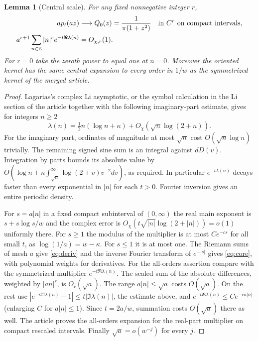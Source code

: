 \documentclass[11pt]{article}
\newtheorem{lemma}[theorem]{Lemma}
\theoremstyle{remark}\newtheorem{remark}[theorem]{Remark}
\begin{document}
\begin{lemma}[Central scale]\label{lem:core}
For any fixed nonnegative integer $r$,
\begin{align}
 a p_t(az)&\longrightarrow Q_0(z)=\frac{1}{\pi(1+z^2)}
       &&\text{in } C^r\text{ on compact intervals},\label{eq:core}\\
 a^{r+1}\sum_{n\in\mathbb Z}|n|^r e^{-t\Re\lambda(n)}&=O_{\chi,r}(1).
       \label{eq:deriv}
\end{align}
For $r=0$ take the zeroth power to equal one at $n=0$.
Moreover the oriented kernel has the same central expansion to every order
in $1/w$ as the symmetrized kernel of the merged article.
\end{lemma}
\begin{proof}
Lagarias's complex Li asymptotic, or the symbol calculation in the
Li section of the article together with the following imaginary-part
estimate, gives for integers $n\ge2$
\[
 \lambda(n)=\tfrac12 n(\log n+\kappa)+O_\chi(\sqrt n\log(2+n)).
\]
For the imaginary part, ordinates of magnitude at most $\sqrt n$ cost
$O(\sqrt n\log n)$ trivially. The remaining signed sine sum is an integral
against $dD(v)$. Integration by parts bounds its absolute value by
$O(\log n+n\int_{\sqrt n}^\infty \log(2+v)v^{-2}dv)$, as required.
In particular $e^{-t\lambda(n)}$ decays faster than every exponential in
$|n|$ for each $t>0$. Fourier inversion gives an entire periodic density.

For $s=a|n|$ in a fixed compact subinterval of $(0,\infty)$ the real
main exponent is $s+s\log s/w$ and the complex error is
$O_\chi(t\sqrt{|n|}\log(2+|n|))=o(1)$ uniformly there. For $s\ge1$
the modulus of the multiplier is at most $Ce^{-cs}$ for all small $t$,
as $\log(1/a)=w-\kappa$. For $s\le1$ it is at most one. The Riemann
sums of mesh $a$ give \eqref{eq:deriv} and the inverse Fourier transform
of $e^{-|s|}$ gives \eqref{eq:core}, with polynomial weights for derivatives.
For the all-orders assertion compare with the symmetrized multiplier
$e^{-t\Re\lambda(n)}$. The scaled sum of the absolute differences, weighted
by $|an|^r$, is $O_r(\sqrt a)$. The range $a|n|\le\sqrt a$ costs
$O(\sqrt a)$. On the rest use
$|e^{-it\Im\lambda(n)}-1|\le t|\Im\lambda(n)|$, the estimate above, and
$e^{-t\Re\lambda(n)}\le C e^{-c a|n|}$ (enlarging $C$ for $a|n|\le1$).
Since $t=2a/w$, summation costs $O(\sqrt a)$ there as well.
The article proves the all-orders expansion for the real-part multiplier
on compact rescaled intervals. Finally $\sqrt a=o(w^{-j})$ for every $j$.
\end{proof}
\end{document}
